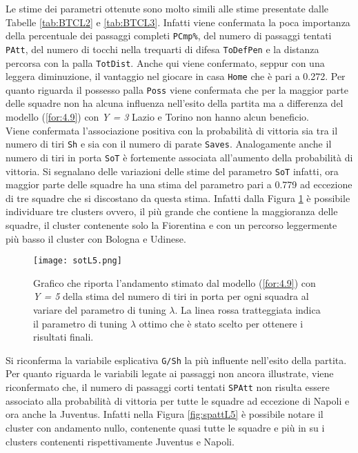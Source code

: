 Le stime dei parametri ottenute sono molto simili alle stime presentate dalle Tabelle \ref{tab:BTCL2} e \ref{tab:BTCL3}. Infatti viene confermata la poca importanza della percentuale dei passaggi completi \texttt{PCmp\%}, del numero di passaggi tentati \texttt{PAtt}, del numero di tocchi nella trequarti di difesa \texttt{ToDefPen} e la distanza percorsa con la palla \texttt{TotDist}.
Anche qui viene confermato, seppur con una leggera diminuzione, il vantaggio nel giocare in casa \texttt{Home} che è pari a 0.272.
Per quanto riguarda il possesso palla \texttt{Poss} viene confermata che per la maggior parte delle squadre non ha alcuna influenza nell'esito della partita ma a differenza del modello (\ref{for:4.9}) con \emph{Y = 3} Lazio e Torino non hanno alcun beneficio.\\
Viene confermata l'associazione positiva con la probabilità di vittoria sia tra il numero di tiri \texttt{Sh} e sia con il numero di parate \texttt{Saves}. Analogamente anche il numero di tiri in porta \texttt{SoT} è fortemente associata all'aumento della probabilità di vittoria. Si segnalano delle variazioni delle stime del parametro \texttt{SoT} infatti, ora maggior parte delle squadre ha una stima del parametro pari a 0.779 ad eccezione di tre squadre che si discostano da questa stima. Infatti dalla Figura \ref{fig:sotL5} è possibile individuare tre clusters ovvero, il più grande che contiene la maggioranza delle squadre, il cluster contenente solo la Fiorentina e con un percorso leggermente più basso il cluster con Bologna e Udinese.
\begin{figure}[htbp]
	\begin{center}
		\texttt{[image: sotL5.png]}
		\caption{Grafico che riporta l'andamento stimato dal modello (\ref{for:4.9}) con \emph{Y = 5} della stima del numero di tiri in porta per ogni squadra al variare del parametro di tuning $\lambda$. La linea rossa tratteggiata indica il parametro di tuning $\lambda$ ottimo che è stato scelto per ottenere i risultati finali.} \label{fig:sotL5}
	\end{center}
\end{figure}
Si riconferma la variabile esplicativa \texttt{G/Sh} la più influente nell'esito della partita.\\
Per quanto riguarda le variabili legate ai passaggi non ancora illustrate, viene riconfermato che, il numero di passaggi corti tentati \texttt{SPAtt} non risulta essere associato alla probabilità di vittoria per tutte le squadre ad eccezione di Napoli e ora anche la Juventus. Infatti nella Figura \ref{fig:spattL5} è possibile notare il cluster con andamento nullo, contenente quasi tutte le squadre e più in su i clusters contenenti rispettivamente Juventus e Napoli.
